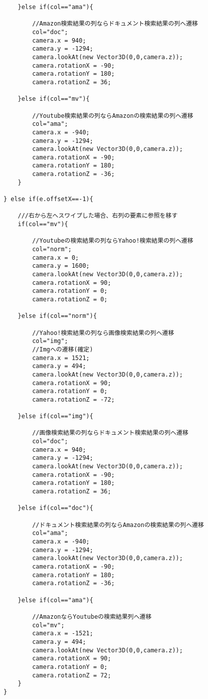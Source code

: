 {\begin{verbatim}
				}else if(col=="ama"){
					
					//Amazon検索結果の列ならドキュメント検索結果の列へ遷移
					col="doc";
					camera.x = 940;
					camera.y = -1294;
					camera.lookAt(new Vector3D(0,0,camera.z));
					camera.rotationX = -90;
					camera.rotationY = 180;
					camera.rotationZ = 36;
				
				}else if(col=="mv"){
					
					//Youtube検索結果の列ならAmazonの検索結果の列へ遷移
					col="ama";
					camera.x = -940;
					camera.y = -1294;
					camera.lookAt(new Vector3D(0,0,camera.z));
					camera.rotationX = -90;
					camera.rotationY = 180;
					camera.rotationZ = -36;
				}
				
			} else if(e.offsetX==-1){
				
				///右から左へスワイプした場合、右列の要素に参照を移す
				if(col=="mv"){
					
					//Youtubeの検索結果の列ならYahoo!検索結果の列へ遷移
					col="norm";
					camera.x = 0;
					camera.y = 1600;
					camera.lookAt(new Vector3D(0,0,camera.z));
					camera.rotationX = 90;
					camera.rotationY = 0;
					camera.rotationZ = 0;
				
				}else if(col=="norm"){
					
					//Yahoo!検索結果の列なら画像検索結果の列へ遷移
					col="img";
					//Imgへの遷移(確定)
					camera.x = 1521;
					camera.y = 494;
					camera.lookAt(new Vector3D(0,0,camera.z));
					camera.rotationX = 90;
					camera.rotationY = 0;
					camera.rotationZ = -72;
				
				}else if(col=="img"){
					
					//画像検索結果の列ならドキュメント検索結果の列へ遷移
					col="doc";
					camera.x = 940;
					camera.y = -1294;
					camera.lookAt(new Vector3D(0,0,camera.z));
					camera.rotationX = -90;
					camera.rotationY = 180;
					camera.rotationZ = 36;
				
				}else if(col=="doc"){
					
					//ドキュメント検索結果の列ならAmazonの検索結果の列へ遷移
					col="ama";
					camera.x = -940;
					camera.y = -1294;
					camera.lookAt(new Vector3D(0,0,camera.z));
					camera.rotationX = -90;
					camera.rotationY = 180;
					camera.rotationZ = -36;
				
				}else if(col=="ama"){
					
					//AmazonならYoutubeの検索結果列へ遷移
					col="mv";
					camera.x = -1521;
					camera.y = 494;
					camera.lookAt(new Vector3D(0,0,camera.z));
					camera.rotationX = 90;
					camera.rotationY = 0;
					camera.rotationZ = 72;
				}
			}
			

\end{verbatim}}

